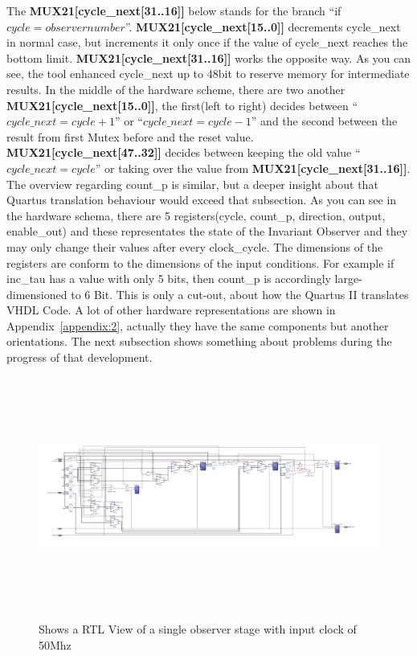 The \textbf{MUX21[cycle\_next[31..16]]} below stands for the branch ``if $cycle=observernumber$''. 
\textbf{MUX21[cycle\_next[15..0]]} decrements cycle\_next in normal case, but increments it only once if the value of cycle\_next reaches the bottom limit. 
\textbf{MUX21[cycle\_next[31..16]]} works the opposite way. 
As you can see, the tool enhanced cycle\_next up to 48bit to reserve memory for intermediate results.
In the middle of the hardware scheme, there are two another \textbf{MUX21[cycle\_next[15..0]]}, 
the first(left to right) decides between  ``$cycle\_next=cycle+1$'' or ``$cycle\_next=cycle-1$'' and the second 
between the result from first Mutex before and the reset value. \textbf{MUX21[cycle\_next[47..32]]} decides between keeping the old value ``$cycle\_next=cycle$'' or 
taking over the value from \textbf{MUX21[cycle\_next[31..16]]}. The overview regarding count\_p is similar, but a deeper insight about that Quartus translation behaviour would exceed that subsection. 
As you can see in the hardware schema, there are 5 registers(cycle, count\_p, direction, output, enable\_out) 
and these representates the state of the Invariant Observer and they may only change their values after every clock\_cycle. 
The dimensions of the registers are conform to the dimensions of the input conditions. 
For example if inc\_tau has a value with only 5 bits, then count\_p is accordingly large-dimensioned to 6 Bit. 
This is only a cut-out, about how the Quartus II translates VHDL Code. 
A lot of other hardware representations are shown in Appendix~\ref{appendix:2}, actually they have the same components but another orientations. 
The next subsection shows something about problems during the progress of that development. 

\begin{figure}[]
\centering
\includegraphics[width=650px,height=300px,angle=-90]{../../pictures/22.02.2014/onlyObserver/OBS_50M.jpg}
\caption[RTL View of Observer 0 with clock 50Mhz]{Shows a RTL View of a single observer stage with input clock of 50Mhz}
\label{fig:test:only:50:obs0}
\end{figure}

